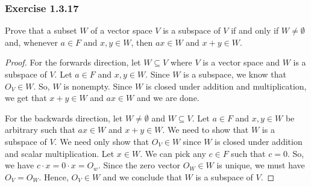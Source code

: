 \subsubsection{Exercise 1.3.17} Prove that a subset \( W  \) of a vector space \( V  \) is a subspace of \( V  \) if and only if \( W \neq \emptyset \) and, whenever \( a \in F  \) and \( x , y \in W  \), then \( ax \in W  \) and \( x + y \in W  \).
\begin{proof}
For the forwards direction, let \( W \subseteq V   \) where \( V  \) is a vector space and \( W  \) is a subspace of \( V  \). Let \( a \in F  \) and \( x,y \in W  \). Since \( W  \) is a subspace, we know that \( O_{V} \in W  \). So, \( W  \) is nonempty. Since \( W  \) is closed under addition and multiplication, we get that \( x + y \in W  \) and \(  ax \in W  \) and we are done.

For the backwards direction, let \( W \neq \emptyset \) and \( W \subseteq V  \). Let \( a \in F  \) and \( x,y \in W  \) be arbitrary such that \( ax \in W  \) and \( x + y \in W  \). We need to show that \( W  \) is a subspace of \( V  \). We need only show that \( O_{V} \in W  \) since \( W  \) is closed under addition and scalar multiplication. Let \( x \in W  \). We can pick any \( c \in F  \) such that \( c = 0  \). So, we have \( c \cdot x = 0 \cdot x = O_{w}. \) Since the zero vector \( O_{W} \in W   \) is unique, we must have \( O_{V} = O_{W} \). Hence, \( O_{V} \in W  \) and we conclude that \( W  \) is a subspace of \(  V \). 
\end{proof} 

